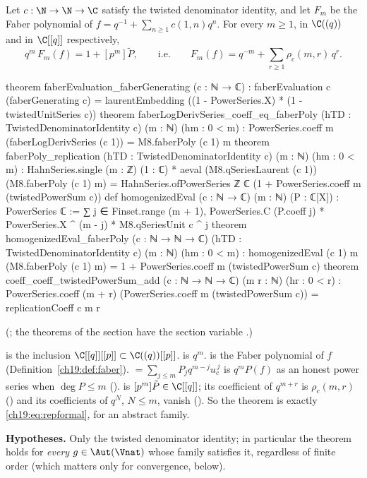 \begin{theorem}\label{ch19:thm:repformal}
Let $c:\N\to\N\to\C$ satisfy the twisted denominator identity, and let $F_m$ be the Faber polynomial of
$f=q^{-1}+\sum_{n\ge1}c(1,n)q^n$.  For every $m\ge1$, in $\C((q))$ and in $\C[[q]]$ respectively,
\begin{equation*}
  q^m\,F_m(f)=1+[p^m]\tilde P,\qquad\text{i.e.}\qquad F_m(f)=q^{-m}+\sum_{r\ge1}\rho_c(m,r)\,q^r .
\end{equation*}
\end{theorem}
\begin{leancode}
theorem faberEvaluation_faberGenerating (c : ℕ → ℂ) :
    faberEvaluation c (faberGenerating c) =
      laurentEmbedding ((1 - PowerSeries.X) * (1 - twistedUnitSeries c))
theorem faberLogDerivSeries_coeff_eq_faberPoly (hTD : TwistedDenominatorIdentity c) (m : ℕ)
    (hm : 0 < m) :
    PowerSeries.coeff m (faberLogDerivSeries (c 1)) = M8.faberPoly (c 1) m
theorem faberPoly_replication (hTD : TwistedDenominatorIdentity c) (m : ℕ) (hm : 0 < m) :
    HahnSeries.single (m : ℤ) (1 : ℂ) * aeval (M8.qSeriesLaurent (c 1)) (M8.faberPoly (c 1) m) =
      HahnSeries.ofPowerSeries ℤ ℂ (1 + PowerSeries.coeff m (twistedPowerSum c))
def homogenizedEval (c : ℕ → ℂ) (m : ℕ) (P : ℂ[X]) : PowerSeries ℂ :=
  ∑ j ∈ Finset.range (m + 1),
    PowerSeries.C (P.coeff j) * PowerSeries.X ^ (m - j) * M8.qSeriesUnit c ^ j
theorem homogenizedEval_faberPoly (c : ℕ → ℕ → ℂ) (hTD : TwistedDenominatorIdentity c) (m : ℕ)
    (hm : 0 < m) :
    homogenizedEval (c 1) m (M8.faberPoly (c 1) m) =
      1 + PowerSeries.coeff m (twistedPowerSum c)
theorem coeff_coeff_twistedPowerSum_add (c : ℕ → ℕ → ℂ) (m r : ℕ) (hr : 0 < r) :
    PowerSeries.coeff (m + r) (PowerSeries.coeff m (twistedPowerSum c)) =
      replicationCoeff c m r
\end{leancode}
(; the theorems of the section  have the section
variable .)
\begin{dictionary}
 is the inclusion $\C[[q]][[p]]\subset\C((q))[[p]]$.   is $q^m$.
 is the Faber polynomial of $f$ (Definition~\ref{ch19:def:faber}).
 $=\sum_{j\le m}P_jq^{m-j}u_c^{\,j}$ is $q^mP(f)$ as an honest power series when $\deg P\le m$
().   is $[p^m]\tilde P\in\C[[q]]$; its
coefficient of $q^{m+r}$ is $\rho_c(m,r)$ () and its coefficients of $q^N$, $N\le m$, vanish
().  So the theorem is exactly \eqref{ch19:eq:repformal}, for an abstract family.

\textbf{Hypotheses.}  Only the twisted denominator identity; in particular the theorem holds for \emph{every} $g\in\Aut(\Vnat)$
whose family satisfies it, regardless of finite order (which matters only for convergence, below).
\end{dictionary}
